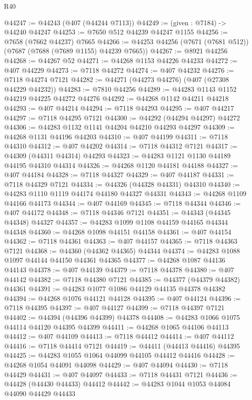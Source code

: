 \begin{lexlean}{R40}
\begin{coremodule}
@44247 := @44243 (@407 (@44244 @7113))
@44249 := (given : @7184) -> @44240 @44247
@44253 := @7650 @512 @44239 @44247 @1155
@44256 := @7658 (@7662 @44237) @7665
@44266 := @44253 @44256 (@7671 (@7681 @512)) (@7687 (@7688 (@7689 @1155) @44239 @7665))
@44267 := @8921 @44256
@44268 := @44267 @52
@44271 := @44268 @1153 @44226 @44233
@44272 := @407 @44229
@44273 := @7118 @44272
@44274 := @407 @44232
@44276 := @7118 @44274 @7121
@44282 := @44271 (@44273 @44276) (@407 (@27308 @44229 @44232))
@44283 := @7810 @44256
@44289 := @44283 @1143 @1152 @44219 @44225 @44272 @44276
@44292 := @44268 @1142 @44211 @44218
@44293 := @407 @44214
@44294 := @7118 @44293
@44295 := @407 @44217
@44297 := @7118 @44295 @7121
@44300 := @44292 (@44294 @44297) @44272
@44306 := @44283 @1132 @1141 @44204 @44210 @44293 @44297
@44309 := @44268 @1131 @44196 @44203
@44310 := @407 @44199
@44311 := @7118 @44310
@44312 := @407 @44202
@44314 := @7118 @44312 @7121
@44317 := @44309 (@44311 @44314) @44293
@44323 := @44283 @1121 @1130 @44189 @44195 @44310 @44314
@44326 := @44268 @1120 @44181 @44188
@44327 := @407 @44184
@44328 := @7118 @44327
@44329 := @407 @44187
@44331 := @7118 @44329 @7121
@44334 := @44326 (@44328 @44331) @44310
@44340 := @44283 @1110 @1119 @44174 @44180 @44327 @44331
@44343 := @44268 @1109 @44166 @44173
@44344 := @407 @44169
@44345 := @7118 @44344
@44346 := @407 @44172
@44348 := @7118 @44346 @7121
@44351 := @44343 (@44345 @44348) @44327
@44357 := @44283 @1099 @1108 @44159 @44165 @44344 @44348
@44360 := @44268 @1098 @44151 @44158
@44361 := @407 @44154
@44362 := @7118 @44361
@44363 := @407 @44157
@44365 := @7118 @44363 @7121
@44368 := @44360 (@44362 @44365) @44344
@44374 := @44283 @1088 @1097 @44144 @44150 @44361 @44365
@44377 := @44268 @1087 @44136 @44143
@44378 := @407 @44139
@44379 := @7118 @44378
@44380 := @407 @44142
@44382 := @7118 @44380 @7121
@44385 := @44377 (@44379 @44382) @44361
@44391 := @44283 @1077 @1086 @44129 @44135 @44378 @44382
@44394 := @44268 @1076 @44121 @44128
@44395 := @407 @44124
@44396 := @7118 @44395
@44397 := @407 @44127
@44399 := @7118 @44397 @7121
@44402 := @44394 (@44396 @44399) @44378
@44408 := @44283 @1066 @1075 @44114 @44120 @44395 @44399
@44411 := @44268 @1065 @44106 @44113
@44412 := @407 @44109
@44413 := @7118 @44412
@44414 := @407 @44112
@44416 := @7118 @44414 @7121
@44419 := @44411 (@44413 @44416) @44395
@44425 := @44283 @1055 @1064 @44099 @44105 @44412 @44416
@44428 := @44268 @1054 @44091 @44098
@44429 := @407 @44094
@44430 := @7118 @44429
@44431 := @407 @44097
@44433 := @7118 @44431 @7121
@44436 := @44428 (@44430 @44433) @44412
@44442 := @44283 @1044 @1053 @44084 @44090 @44429 @44433

\end{coremodule}
\end{lexlean}
